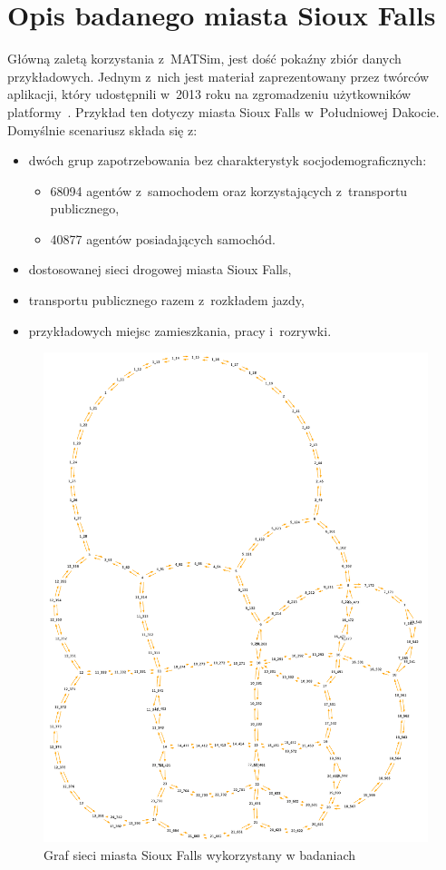 \documentclass[twoside,12pt]{report}
\begin{document}
\section{Opis badanego miasta Sioux Falls}\label{rozdz.opis_siouxfalls}

Główną zaletą korzystania z~MATSim, jest dość pokaźny zbiór danych przykładowych. Jednym z~nich jest materiał zaprezentowany przez twórców aplikacji, który udostępnili w~2013 roku na zgromadzeniu użytkowników platformy~\cite{siux}. Przykład ten dotyczy miasta Sioux Falls w~Południowej Dakocie. Domyślnie scenariusz składa się z:

\begin{itemize}
\item dwóch grup zapotrzebowania bez charakterystyk socjodemograficznych:
\begin{itemize}
\item 68094 agentów z~samochodem oraz korzystających z~transportu publicznego,
\item 40877 agentów posiadających samochód.
\end{itemize}
\item dostosowanej sieci drogowej miasta Sioux Falls,
\item transportu publicznego razem z~rozkładem jazdy,
\item przykładowych miejsc zamieszkania, pracy i~rozrywki.
\end{itemize}

\begin{figure}[h!]
	\centering
	\includegraphics[totalheight=0.560\textheight,angle=90]{img/sioux/network}
	\caption{Graf sieci miasta Sioux Falls wykorzystany w badaniach} 
	\label{fig:siouxfalls_siec}
\end{figure}
\end{document}
